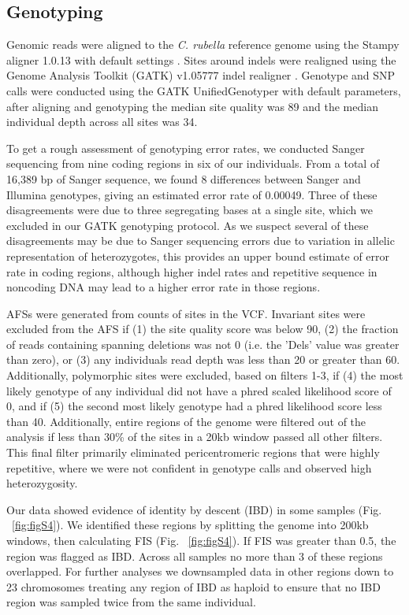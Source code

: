 \subsection{Genotyping}
Genomic reads were aligned to the \textit{C. rubella} reference genome \citep{Slotte2013-py} using the Stampy aligner 1.0.13 with default settings \citep{Lunter2011-uc}. Sites around indels were realigned using the Genome Analysis Toolkit (GATK) v1.05777 indel realigner \citep{DePristo2011-jc}. Genotype and SNP calls were conducted using the GATK UnifiedGenotyper with default parameters, after aligning and genotyping the median site quality was 89 and the median individual depth across all sites was 34. 

To get a rough assessment of genotyping error rates, we conducted Sanger sequencing from nine coding regions in six of our individuals. From a total of 16,389 bp of Sanger sequence, we found 8 differences between Sanger and Illumina genotypes, giving an estimated error rate of 0.00049. Three of these disagreements were due to three segregating bases at a single site, which we excluded in our GATK genotyping protocol. As we suspect several of these disagreements may be due to Sanger sequencing errors due to variation in allelic representation of heterozygotes, this provides an upper bound estimate of error rate in coding regions, although higher indel rates and repetitive sequence in noncoding DNA may lead to a higher error rate in those regions. 

AFSs were generated from counts of sites in the VCF. Invariant sites were excluded from the AFS if (1) the site quality score was below 90, (2) the fraction of reads containing spanning deletions was not 0 (i.e. the 'Dels' value was greater than zero), or (3) any individual\textsc{}s read depth was less than 20 or greater than 60. Additionally, polymorphic sites were excluded, based on filters 1-3, if (4) the most likely genotype of any individual did not have a phred scaled likelihood score of 0, and if (5) the second most likely genotype had a phred likelihood score less than 40. Additionally, entire regions of the genome were filtered out of the analysis if less than 30\% of the sites in a 20kb window passed all other filters. This final filter primarily eliminated pericentromeric regions that were highly repetitive, where we were not confident in genotype calls and observed high heterozygosity.

Our data showed evidence of identity by descent (IBD) in some samples (Fig. ~\ref{fig:figS4}). We identified these regions by splitting the genome into 200kb windows, then calculating FIS (Fig. ~\ref{fig:figS4}). If FIS was greater than 0.5, the region was flagged as IBD. Across all samples no more than 3 of these regions overlapped. For further analyses we downsampled data in other regions down to 23 chromosomes treating any region of IBD as haploid to ensure that no IBD region was sampled twice from the same individual.

